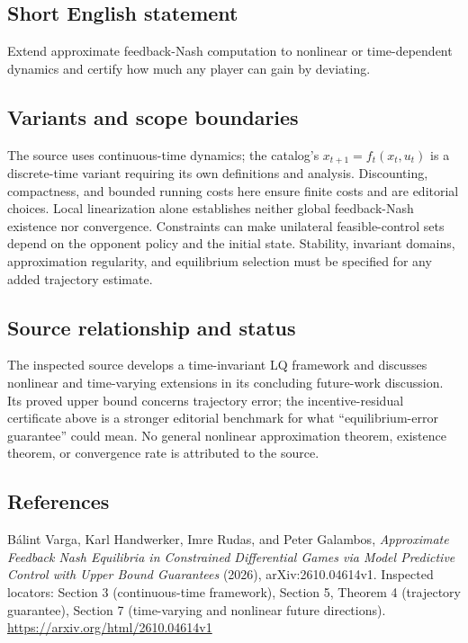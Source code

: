 \documentclass[11pt,a4paper]{article}
\begin{document}
\subsection*{Short English statement}
Extend approximate feedback-Nash computation to nonlinear or time-dependent dynamics and certify how much any player can gain by deviating.

\subsection*{Variants and scope boundaries}
The source uses continuous-time dynamics; the catalog's $x_{t+1}=f_t(x_t,u_t)$ is a discrete-time variant requiring its own definitions and analysis. Discounting, compactness, and bounded running costs here ensure finite costs and are editorial choices. Local linearization alone establishes neither global feedback-Nash existence nor convergence. Constraints can make unilateral feasible-control sets depend on the opponent policy and the initial state. Stability, invariant domains, approximation regularity, and equilibrium selection must be specified for any added trajectory estimate.

\subsection*{Source relationship and status}
The inspected source develops a time-invariant LQ framework and discusses nonlinear and time-varying extensions in its concluding future-work discussion. Its proved upper bound concerns trajectory error; the incentive-residual certificate above is a stronger editorial benchmark for what ``equilibrium-error guarantee'' could mean. No general nonlinear approximation theorem, existence theorem, or convergence rate is attributed to the source.

\subsection*{References}
\begingroup\footnotesize\raggedright
\noindent [S1] B\'alint Varga, Karl Handwerker, Imre Rudas, and Peter Galambos, \emph{Approximate Feedback Nash Equilibria in Constrained Differential Games via Model Predictive Control with Upper Bound Guarantees} (2026), arXiv:2610.04614v1. Inspected locators: Section 3 (continuous-time framework), Section 5, Theorem 4 (trajectory guarantee), Section 7 (time-varying and nonlinear future directions).
\url{https://arxiv.org/html/2610.04614v1}
\end{document}

